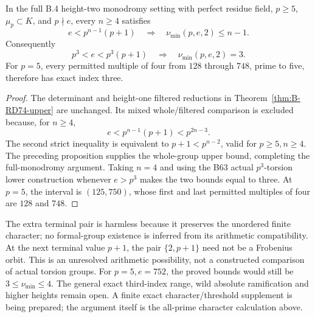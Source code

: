 \begin{theorem}
\label{thm:B-RD75}
In the full B.4 height-two monodromy setting with perfect
residue field, \(p\ge5\), \(\mu_p\subset K\), and \(p\nmid e\),
every \(n\ge4\) satisfies
\[
 e<p^{n-1}(p+1)\quad\Longrightarrow\quad
 \nu_{\min}(p,e,2)\le n-1.
 \tag{B-RD75.5}
\]
Consequently
\[
 p^3<e<p^3(p+1)\quad\Longrightarrow\quad
 \boxed{\nu_{\min}(p,e,2)=3}.
 \tag{B-RD75.6}
\]
For \(p=5\), every permitted multiple of four from \(128\)
through \(748\), prime to five, therefore has exact index three.
\end{theorem}
\begin{proof}
The determinant and height-one filtered reductions in
Theorem~\ref{thm:B-RD74-upper} are unchanged. Its mixed
whole/filtered comparison is excluded because, for \(n\ge4\),
\[
 e<p^{n-1}(p+1)<p^{2n-3}.
 \tag{B-RD75.7}
\]
The second strict inequality is equivalent to
\(p+1<p^{n-2}\), valid for \(p\ge5,n\ge4\).
The preceding proposition supplies the whole-group upper
bound, completing the full-monodromy argument.
Taking \(n=4\) and using the B63 actual \(p^3\)-torsion
lower construction whenever \(e>p^3\) makes the two bounds
equal to three. At \(p=5\), the interval is \((125,750)\),
whose first and last permitted multiples of four are \(128\)
and \(748\).
\end{proof}

\begin{remark}
\label{rem:B-RD75-scope}
The extra terminal pair is harmless because it preserves the
unordered finite character; no formal-group existence is
inferred from its arithmetic compatibility. At the next
terminal value \(p+1\), the pair \(\{2,p+1\}\) need not be
a Frobenius orbit. This is an unresolved arithmetic possibility,
not a constructed comparison of actual torsion groups.
For \(p=5,e=752\), the proved bounds would still be
\(3\le\nu_{\min}\le4\). The general exact third-index range,
wild absolute ramification and higher heights remain open.
A finite exact character/threshold supplement is being prepared;
the argument itself is the all-prime character calculation above.
\end{remark}
